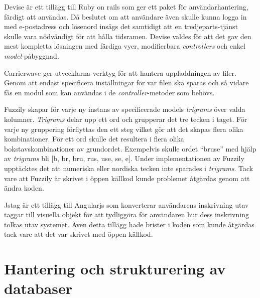 Devise är ett tillägg till Ruby on rails som ger ett paket för
användarhantering, färdigt att användas. Då beslutet om att användare även
skulle kunna logga in med e-postadress och lösenord insågs det samtidigt att en
tredjeparts-tjänst skulle vara nödvändigt för att hålla tidsramen. Devise valdes
för att det gav den mest kompletta lösningen med färdiga vyer, modifierbara
\emph{controllers} och enkel \emph{model}-påbyggnad.

Carrierwave ger utvecklarna verktyg för att hantera uppladdningen av filer.
Genom att endast specificera inställningar för var filen ska sparas och så
vidare fås en modul som kan användas i de \emph{controller}-metoder som behövs.

Fuzzily skapar för varje ny instans av specificerade models \emph{trigrams} över
valda kolumner. \emph{Trigrams} delar upp ett ord och grupperar det tre tecken i
taget\cite{n-grams}. För varje ny gruppering förflyttas den ett steg vilket gör
att det skapas flera olika kombinationer. För ett ord skulle det resultera i
flera olika bokstavskombinationer av grundordet. Exempelvis skulle ordet “bruse”
med hjälp av \emph{trigrams} bli [b, br, bru, rus, use, se, e]. Under
implementationen av Fuzzily upptäcktes det att numeriska eller nordiska tecken
inte sparades i \emph{trigrams}. Tack vare att Fuzzily är skrivet i öppen
källkod kunde problemet åtgärdas genom att ändra koden.

Jstag är ett tillägg till Angularjs som konverterar användarens inskrivning utav
taggar till visuella objekt för att tydliggöra för användaren hur dess
inskrivning tolkas utav systemet. Även detta tillägg hade brister i koden som
kunde åtgärdas tack vare att det var skrivet med öppen källkod.

\section{Hantering och strukturering av databaser}

